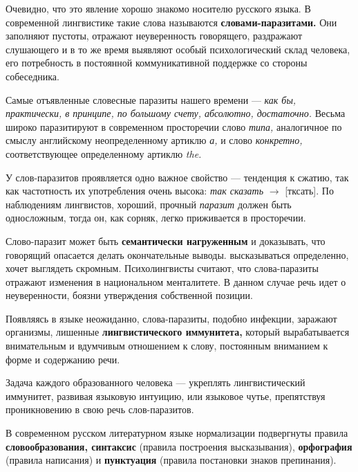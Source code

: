 Очевидно, что это явление хорошо знакомо носителю русского языка.
В современной лингвистике такие слова называются \textbf{словами-паразитами.}
Они заполняют пустоты, отражают неуверенность говорящего, раздражают слушающего и в то же время выявляют особый психологический склад человека, его потребность в постоянной коммуникативной поддержке со стороны собеседника.

Самые отъявленные словесные паразиты нашего времени ---
\textit{как бы, практически, в принципе, по большому счету, абсолютно,
достаточно.}
Весьма широко паразитируют в современном просторечии слово \textit{типа,} аналогичное по смыслу английскому неопределенному артиклю \textit{а,} и слово \textit{конкретно,} соответствующее определенному артиклю \textit{the.}

У слов-паразитов проявляется одно важное свойство --- тенденция к сжатию, так как частотность их употребления очень высока: \textit{так сказать} $\rightarrow$ [тксать].
По наблюдениям лингвистов, хороший, прочный \textit{паразит} должен быть односложным, тогда он, как сорняк, легко приживается в просторечии.

Слово-паразит может быть \textbf{семантически нагруженным} и доказывать, что говорящий опасается делать окончательные выводы. высказываться определенно, хочет выглядеть скромным.
Психолингвисты считают, что слова-паразиты отражают изменения в национальном менталитете.
В данном случае речь идет о неуверенности, боязни утверждения собственной позиции.

Появляясь в языке неожиданно, слова-паразиты, подобно инфекции, заражают организмы, лишенные \textbf{лингвистического иммунитета,} который вырабатывается внимательным и вдумчивым отношением к слову, постоянным вниманием к форме и содержанию речи.

Задача каждого образованного человека --- укреплять лингвистический иммунитет, развивая языковую интуицию, или языковое чутье, препятствуя проникновению в свою речь слов-паразитов.

В современном русском литературном языке нормализации подвергнуты правила \textbf{словообразования, синтаксис} (правила построения высказывания), \textbf{орфография} (правила написания) и \textbf{пунктуация} (правила постановки знаков препинания).
